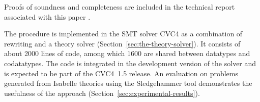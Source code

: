 \begin{paper}
Proofs of soundness and completeness are included in the technical report
associated with this paper \cite{our-report}.
\end{paper}%
The procedure is implemented in the SMT solver CVC4 as a combination
of rewriting and a theory solver
(Section~\ref{sec:the-theory-solver}).
It consists of about 2000 lines of \cpp{} code, among which 1600 are
shared between datatypes and codatatypes. The code is integrated in the
development version of the solver and is expected to be part of the CVC4~1.5 release.
%
An evaluation on %
problems generated from Isabelle theories using the Sledgehammer tool
demonstrates the usefulness of the approach (Section~\ref{sec:experimental-results}).



%









